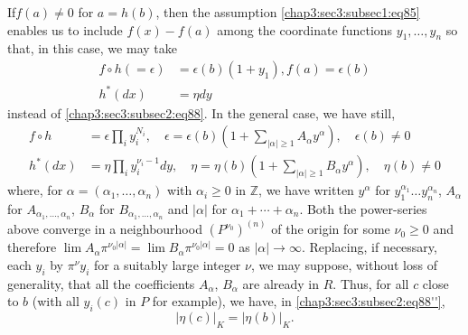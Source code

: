 If\pageoriginale $f(a)\neq 0$ for $a=h(b)$, then the assumption
\ref{chap3:sec3:subsec1:eq85} enables us to include $f(x)-f(a)$ among
the coordinate 
functions $y_{1},\ldots,y_{n}$ so that, in this case, we may take
\begin{equation*}
\begin{split}
f\circ h(=\epsilon) &= \epsilon(b)(1+y_{1}), f(a)=\epsilon(b)\\
h^{\ast}(dx) &= \eta dy
\end{split}\tag*{$(88)'$}\label{chap3:sec3:subsec2:eq88'}
\end{equation*}
instead of \ref{chap3:sec3:subsec2:eq88}. In the general case, we have still,
\begin{equation*}
\begin{split}
  f\circ h &= \epsilon\prod_{i}y^{N_{i}}_{i},\quad
  \epsilon=\epsilon(b)\left(1+\sum\limits_{|\alpha|\geq
    1}A_{\alpha}y^{\alpha}\right),\quad \epsilon(b)\neq 0\\
  h^{\ast}(dx) &= \eta \prod_{i}y^{\nu_{i}-1}_{i}dy,\quad
  \eta=\eta(b)\left(1+\sum_{|\alpha|\geq
    1}B_{\alpha}y^{\alpha}\right),\quad \eta(b)\neq 0
\end{split}\tag*{$(88)''$}\label{chap3:sec3:subsec2:eq88''}
\end{equation*}
where, for $\alpha=(\alpha_{1},\ldots,\alpha_{n})$ with
$\alpha_{i}\geq 0$ in $\mathbb{Z}$, we have written $y^{\alpha}$ for
$y^{\alpha_{1}}_{1}\ldots y^{\alpha_{n}}_{n}$, $A_{\alpha}$ for
$A_{\alpha_{1},\ldots,\alpha_{n}}$, $B_{\alpha}$ for
$B_{\alpha_{1},\ldots,\alpha_{n}}$ and $|\alpha|$ for
$\alpha_{1}+\cdots+\alpha_{n}$. Both the power-series above converge
in a neighbourhood $(P^{\nu_{0}})^{(n)}$ of the origin for some
$\nu_{0}\geq 0$ and therefore $\lim
A_{\alpha}\pi^{\nu_{0}|\alpha|}=\lim
B_{\alpha}\pi^{\nu_{0}|\alpha|}=0$ as $|\alpha|\to \infty$. Replacing,
if necessary, each $y_{i}$ by $\pi^{\nu}y_{i}$ for a suitably large
integer $\nu$, we may suppose, without loss of generality, that all
the coefficients $A_{\alpha}$, $B_{\alpha}$ are already in $R$. Thus,
for all $c$ close to $b$ (\ie with all $y_{i}(c)$ in $P$ for example),
we have, in \ref{chap3:sec3:subsec2:eq88''},
\begin{equation*}
  |\eta(c)|_{K}=|\eta(b)|_{K}.\tag{90}\label{chap3:sec3:subsec2:eq90}
\end{equation*}


